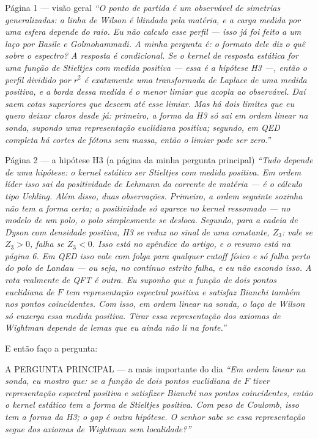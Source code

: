 \documentclass[12pt,a4paper]{article}
\newcommand{\fala}[1]{\textit{\color{ink}``#1''}}
\begin{document}
\begin{say}{Página 1 --- visão geral}
\fala{O ponto de partida é um observável de simetrias generalizadas: a linha de
Wilson é blindada pela matéria, e a carga medida por uma esfera depende do raio.
Eu não calculo esse perfil --- isso já foi feito a um laço por Basile e
Golmohammadi. A minha pergunta é: o \emph{formato} dele diz o quê sobre o
espectro? A resposta é condicional. Se o kernel de resposta estática for uma
função de Stieltjes com medida positiva --- essa é a hipótese H3 ---, então o perfil
dividido por $r^2$ é exatamente uma transformada de Laplace de uma medida
positiva, e a borda dessa medida é o menor limiar que acopla ao observável.
Daí saem cotas superiores que descem até esse limiar. Mas há dois limites que eu
quero deixar claros desde já: primeiro, a forma da H3 só sai em ordem linear
na sonda, supondo uma representação euclidiana positiva; segundo, em QED
completa há cortes de fótons sem massa, então o limiar pode ser zero.}
\end{say}

\begin{say}{Página 2 --- a hipótese H3 (a página da minha pergunta principal)}
\fala{Tudo depende de uma hipótese: o kernel estático ser Stieltjes com medida
positiva. Em ordem líder isso sai da positividade de Lehmann da corrente de
matéria --- é o cálculo tipo Uehling. Além disso, duas observações. Primeiro, a
ordem seguinte sozinha \emph{não} tem a forma certa; a positividade só aparece
no kernel ressomado --- no modelo de um polo, o polo simplesmente se desloca.
Segundo, para a cadeia de Dyson com densidade positiva, H3 se reduz ao sinal de
uma constante, $Z_3$: vale se $Z_3>0$, falha se $Z_3<0$. Isso está no apêndice
do artigo, e o resumo está na página 6. Em QED isso vale com folga para
qualquer cutoff físico e só falha perto do polo de Landau --- ou seja, no
contínuo estrito falha, e eu não escondo isso. A rota realmente de QFT é
outra. Eu suponho que a função de dois pontos euclidiana de $F$ tem
representação espectral positiva e satisfaz Bianchi também nos pontos
coincidentes. Com isso, em ordem linear na sonda, o laço de Wilson só enxerga
essa medida positiva. Tirar essa representação dos axiomas de Wightman
depende de lemas que eu ainda não li na fonte.}
\end{say}
E então faço a pergunta:
\begin{safe}{A PERGUNTA PRINCIPAL --- a mais importante do dia}
\fala{Em ordem linear na sonda, eu mostro que: se a função de dois pontos
euclidiana de $F$ tiver representação espectral positiva e satisfizer Bianchi
nos pontos coincidentes, então o kernel estático tem a forma de Stieltjes
positiva. Com peso de Coulomb, isso tem a forma da H3; o gap é outra
hipótese. O senhor sabe se essa representação segue dos axiomas de Wightman
sem localidade?}
\end{safe}
\end{document}
